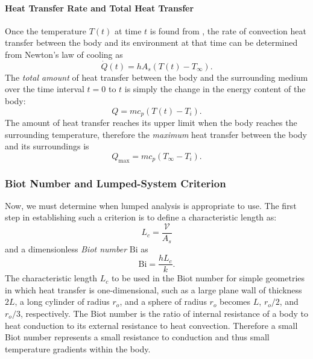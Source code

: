\paragraph{Heat Transfer Rate and Total Heat Transfer}
Once the temperature $T(t)$ at time $t$ is found from , the rate of convection heat transfer between the body and its environment at that time can be determined from Newton's law of cooling as
\begin{equation*}
  \dot{Q}(t) = h A_s \left( T(t) - T_{\infty} \right)
.\end{equation*}
The \textit{total amount} of heat transfer between the body and the surrounding medium over the time interval $t = 0$ to $t$ is simply the change in the energy content of the body:
\begin{equation*}
  Q = m c_p (T(t) - T_i)
.\end{equation*}
The amount of heat transfer reaches its upper limit when the body reaches the surrounding temperature, therefore the \textit{maximum} heat transfer between the body and its surroundings is
\begin{equation*}
  Q_{\text{max}} = m c_p (T_{\infty} - T_i)
.\end{equation*}


\subsubsection{Biot Number and Lumped-System Criterion}
Now, we must determine when lumped analysis is appropriate to use.
The first step in establishing such a criterion is to define a characteristic length as:
\begin{equation*}
  L_c = \frac{\mathscr{V}}{A_s}
\end{equation*}
and a dimensionless \textit{Biot number} $\mathrm{Bi}$ as
\begin{equation} \label{eq:biot}
  \mathrm{Bi} = \frac{h L_c}{k}
.\end{equation}
The characteristic length $L_c$ to be used in the Biot number for simple geometries in which heat transfer is one-dimensional, such as a large plane wall of thickness $2L$, a long cylinder of radius $r_o$, and a sphere of radius $r_o$ becomes $L$, $r_o / 2$, and $r_o / 3$, respectively.
The Biot number is the ratio of internal resistance of a body to heat conduction to its external resistance to heat convection. 
Therefore a small Biot number represents a small resistance to conduction and thus small temperature gradients within the body.

